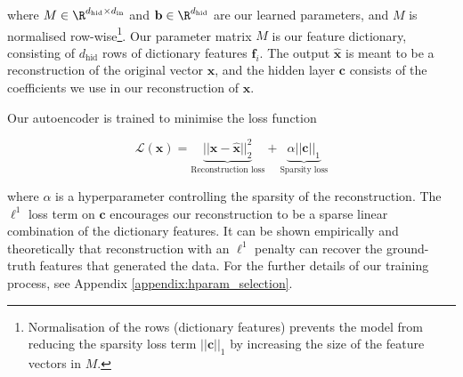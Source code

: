 where $M \in \R^{d_{\text{hid}} \times d_{\text{in}}}$ and $\mathbf{b} \in \R^{d_{\text{hid}}}$ are our learned parameters, and $M$ is normalised row-wise\footnote{Normalisation of the rows (dictionary features) prevents the model from reducing the sparsity loss term $||\mathbf{c}||_1$ by increasing the size of the feature vectors in $M$.}. Our parameter matrix $M$ is our feature dictionary, consisting of $d_{\text{hid}}$ rows of dictionary features $\mathbf{f}_i$. The output $\mathbf{\hat x}$ is meant to be a reconstruction of the original vector $\mathbf x$, and the hidden layer $\mathbf c$ consists of the coefficients we use in our reconstruction of $\mathbf x$. 




Our autoencoder is trained to minimise the loss function

\begin{equation}
\label{eqn:loss_function}
    \mathcal L(\mathbf x)= \underbrace{||\mathbf{x}- \mathbf{\hat x}||_2^2}_{\text{Reconstruction loss}} + \underbrace{\alpha ||\mathbf{c}||_1}_{\text{Sparsity loss}}
\end{equation}

where $\alpha$ is a hyperparameter controlling the sparsity of the reconstruction. The $\ell^1$ loss term on $\mathbf c$ encourages our reconstruction to be a sparse linear combination of the dictionary features. It can be shown empirically \citep{sharkey2023technical} and theoretically \citep{wright2022high} that reconstruction with an $\ell^1$ penalty can recover the ground-truth features that generated the data. For the further details of our training process, see Appendix \ref{appendix:hparam_selection}.

